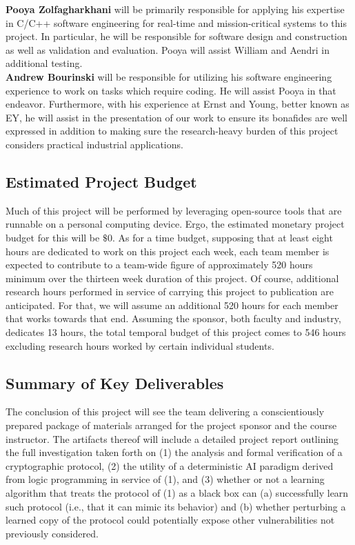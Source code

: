 \documentclass[11pt]{article}
\begin{document}
\noindent
\textbf{Pooya Zolfagharkhani} will be primarily responsible for applying his expertise in C/C++ software engineering for real-time and mission-critical systems to this project. In particular, he will be responsible for software design and construction as well as validation and evaluation. Pooya will assist William and Aendri in additional testing.\\

\noindent
\textbf{Andrew Bourinski} will be responsible for utilizing his software engineering experience to work on tasks which require coding. He will assist Pooya in that endeavor. Furthermore, with his experience at Ernst and Young, better known as EY, he will assist in the presentation of our work to ensure its bonafides are well expressed in addition to making sure the research-heavy burden of this project considers practical industrial applications.  


\subsection{Estimated Project Budget}
\label{sec:estprojbudget}
Much of this project will be performed by leveraging open-source tools that are runnable on a personal computing device. Ergo, the estimated monetary project budget for this will be $\$0$. As for a time budget, supposing that at least eight hours are dedicated to work on this project each week, each team member is expected to contribute to a team-wide figure of approximately 520 hours minimum over the thirteen week duration of this project. Of course, additional research hours performed in service of carrying this project to publication are anticipated. For that, we will assume an additional 520 hours for each member that works towards that end. Assuming the sponsor, both faculty and industry, dedicates 13 hours, the total temporal budget of this project comes to 546 hours excluding research hours worked by certain individual students. 


\subsection{Summary of Key Deliverables}
The conclusion of this project will see the team delivering a conscientiously prepared package of materials arranged for the project sponsor and the course instructor. The artifacts thereof will include a detailed project report outlining the full investigation taken forth on (1) the analysis and formal verification of a cryptographic protocol, (2) the utility of a deterministic AI paradigm derived from logic programming in service of (1), and (3) whether or not a learning algorithm that treats the protocol of (1) as a black box can (a) successfully learn such protocol (i.e., that it can mimic its behavior) and (b) whether perturbing a learned copy of the protocol could potentially expose other vulnerabilities not previously considered. 
\end{document}
